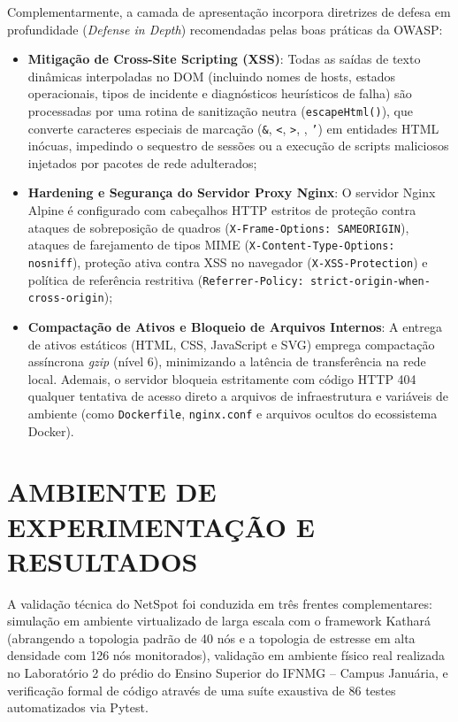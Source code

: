 \documentclass[12pt,a4paper]{article}
\begin{document}
Complementarmente, a camada de apresentação incorpora diretrizes de defesa em profundidade (\textit{Defense in Depth}) recomendadas pelas boas práticas da OWASP:
\begin{itemize}[leftmargin=1.25cm]
\item \textbf{Mitigação de Cross-Site Scripting (XSS)}: Todas as saídas de texto dinâmicas interpoladas no DOM (incluindo nomes de hosts, estados operacionais, tipos de incidente e diagnósticos heurísticos de falha) são processadas por uma rotina de sanitização neutra (\texttt{escapeHtml()}), que converte caracteres especiais de marcação (\texttt{\&}, \texttt{<}, \texttt{>}, \texttt{\textquotedbl}, \texttt{'}) em entidades HTML inócuas, impedindo o sequestro de sessões ou a execução de scripts maliciosos injetados por pacotes de rede adulterados;
\item \textbf{Hardening e Segurança do Servidor Proxy Nginx}: O servidor Nginx Alpine é configurado com cabeçalhos HTTP estritos de proteção contra ataques de sobreposição de quadros (\texttt{X-Frame-Options: SAMEORIGIN}), ataques de farejamento de tipos MIME (\texttt{X-Content-Type-Options: nosniff}), proteção ativa contra XSS no navegador (\texttt{X-XSS-Protection}) e política de referência restritiva (\texttt{Referrer-Policy: strict-origin-when-cross-origin});
\item \textbf{Compactação de Ativos e Bloqueio de Arquivos Internos}: A entrega de ativos estáticos (HTML, CSS, JavaScript e SVG) emprega compactação assíncrona \textit{gzip} (nível 6), minimizando a latência de transferência na rede local. Ademais, o servidor bloqueia estritamente com código HTTP 404 qualquer tentativa de acesso direto a arquivos de infraestrutura e variáveis de ambiente (como \texttt{Dockerfile}, \texttt{nginx.conf} e arquivos ocultos do ecossistema Docker).
\end{itemize}

\section{AMBIENTE DE EXPERIMENTAÇÃO E RESULTADOS}
A validação técnica do NetSpot foi conduzida em três frentes complementares: simulação em ambiente virtualizado de larga escala com o framework Kathará (abrangendo a topologia padrão de 40 nós e a topologia de estresse em alta densidade com 126 nós monitorados), validação em ambiente físico real realizada no Laboratório 2 do prédio do Ensino Superior do IFNMG -- Campus Januária, e verificação formal de código através de uma suíte exaustiva de 86 testes automatizados via Pytest.
\end{document}
